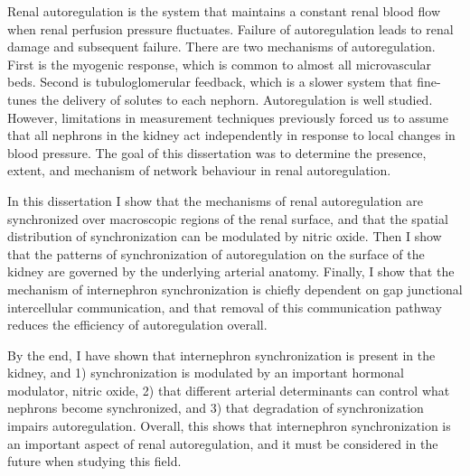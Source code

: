 

%
Renal autoregulation is the system that maintains a constant renal blood flow when renal perfusion pressure fluctuates. Failure of autoregulation leads to renal damage and subsequent failure. There are two mechanisms of autoregulation. First is the myogenic response, which is common to almost all microvascular beds. Second is tubuloglomerular feedback, which is a slower system that fine-tunes the delivery of solutes to each nephorn. Autoregulation is well studied. However, limitations in measurement techniques previously forced us to assume that all nephrons in the kidney act independently in response to local changes in blood pressure. The goal of this dissertation was to determine the presence, extent, and mechanism of network behaviour in renal autoregulation. 

In this dissertation I show that the mechanisms of renal autoregulation are synchronized over macroscopic regions of the renal surface, and that the spatial distribution of synchronization can be modulated by nitric oxide. Then I show that the patterns of synchronization of autoregulation on the surface of the kidney are governed by the underlying arterial anatomy. Finally, I show that the mechanism of internephron synchronization is chiefly dependent on gap junctional intercellular communication, and that removal of this communication pathway reduces the efficiency of autoregulation overall.

By the end, I have shown that internephron synchronization is present in the kidney, and 1) synchronization is modulated by an important hormonal modulator, nitric oxide, 2) that different arterial determinants can control what nephrons become synchronized, and 3) that degradation of synchronization impairs autoregulation. Overall, this shows that internephron synchronization is an important aspect of renal autoregulation, and it must be considered in the future when studying this field.

%
